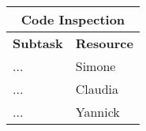 \vspace* {30px}

\begin{center}
\begin{tabular}{ |l|l| }
	\multicolumn{2}{c}{\textbf{Code Inspection}} \\ \hline
	\textbf{Subtask} & \textbf{Resource} \\ \hline
	\multirow{1}{*}{...} & Simone \\ \hline
	\multirow{1}{*}{...} & Claudia \\ \hline
	\multirow{1}{*}{...} & Yannick \\ \hline


\end{tabular}
\end{center}